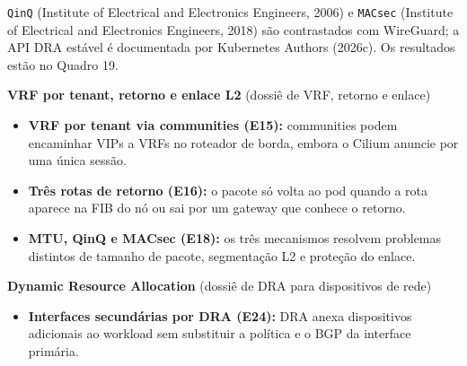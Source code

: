 \documentclass[12pt,openany,oneside,a4paper,chapter=TITLE,english,brazil]{abntex2}
\providecommand{\tightlist}{\setlength{\itemsep}{0pt}\setlength{\parskip}{0pt}}
\begin{document}
\texttt{Qin\allowbreak{}Q} (Institute of Electrical and Electronics Engineers, 2006) e \texttt{MACsec} (Institute of Electrical and Electronics Engineers, 2018) são contrastados com WireGuard; a API DRA estável é documentada por Kubernetes Authors (2026c). Os resultados estão no Quadro 19.

\textbf{VRF por tenant, retorno e enlace L2} (dossiê de VRF, retorno e enlace)

\begin{itemize}
\tightlist
\item
  \textbf{VRF por tenant via communities (E15):} communities podem encaminhar VIPs a VRFs no roteador de borda, embora o Cilium anuncie por uma única sessão.
\item
  \textbf{Três rotas de retorno (E16):} o pacote só volta ao pod quando a rota aparece na FIB do nó ou sai por um gateway que conhece o retorno.
\item
  \textbf{MTU, QinQ e MACsec (E18):} os três mecanismos resolvem problemas distintos de tamanho de pacote, segmentação L2 e proteção do enlace.
\end{itemize}

\textbf{Dynamic Resource Allocation} (dossiê de DRA para dispositivos de rede)

\begin{itemize}
\tightlist
\item
  \textbf{Interfaces secundárias por DRA (E24):} DRA anexa dispositivos adicionais ao workload sem substituir a política e o BGP da interface primária.
\end{itemize}
\end{document}
